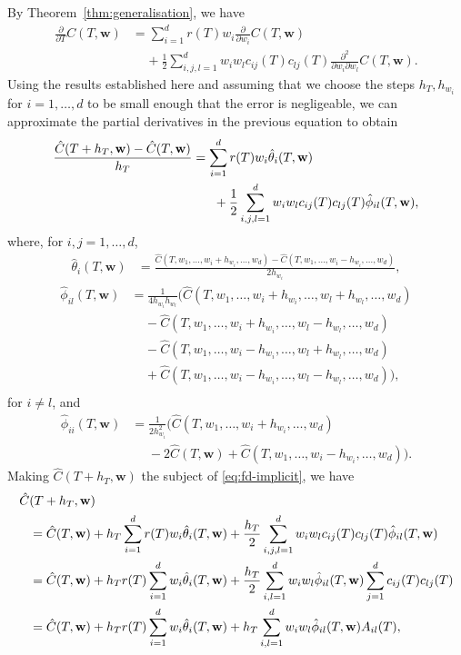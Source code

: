 \documentclass[english]{article}
\numberwithin{equation}{section}
\numberwithin{figure}{section}
\theoremstyle{bolddescit}
\theoremstyle{definition}
\theoremstyle{definition}
\theoremstyle{plain}
\theoremstyle{plain}
\theoremstyle{bolddesc}
\theoremstyle{plain}
\theoremstyle{remark}
\begin{document}
By Theorem~\ref{thm:generalisation}, we have
\begin{align*}
  \frac{\partial}{\partial T} C(T,\mathbf{w})
  &= \sum_{i=1}^{d} r(T) w_i \frac{\partial}{\partial w_i} C(T,\mathbf{w})\\
  &\ \ \ \ \ + \frac{1}{2} \sum_{i,j,l=1}^{d} w_i w_l c_{ij}(T) c_{lj}(T) \frac{\partial^2}{\partial w_i \partial w_l} C(T,\mathbf{w}).
\end{align*}
Using the results established here and assuming that we choose the steps $h_T, h_{w_i}$ for $i=1,\ldots,d$ to be small enough that the error is negligeable, we can approximate the partial derivatives in the previous equation to obtain
\begin{align}\label{eq:fd-implicit}
  \frac{\hat{C}(T+h_T,\mathbf{w}) - \hat{C}(T,\mathbf{w})}{h_T}
  &= \sum_{i=1}^{d} r(T) w_i \hat{\theta}_i(T,\mathbf{w})\notag\\
    &\ \ \ \ \ + \frac{1}{2} \sum_{i,j,l=1}^{d} w_i w_l c_{ij}(T) c_{lj}(T) \hat{\phi}_{il}(T,\mathbf{w}),
\end{align}
where, for $i,j=1,\ldots,d$,
\begin{align*}
  \hat{\theta}_i(T,\mathbf{w})
  &= \frac{\hat{C}(T,w_1,\ldots,w_i+h_{w_i},\ldots,w_d) - \hat{C}(T,w_1,\ldots,w_i-h_{w_i},\ldots,w_d)}{2h_{w_i}},
\end{align*}
\begin{align*}
  \hat{\phi}_{il}(T,\mathbf{w})
  &= \frac{1}{4 h_{w_i} h_{w_l}} \Bigg( \hat{C}(T,w_1,\ldots,w_i+h_{w_i},\ldots,w_l+h_{w_l},\ldots,w_d)\\
  &\ \ \ \ \ - \hat{C}(T,w_1,\ldots,w_i+h_{w_i},\ldots,w_l-h_{w_l},\ldots,w_d)\\
  &\ \ \ \ \ - \hat{C}(T,w_1,\ldots,w_i-h_{w_i},\ldots,w_l+h_{w_l},\ldots,w_d)\\
  &\ \ \ \ \ + \hat{C}(T,w_1,\ldots,w_i-h_{w_i},\ldots,w_l-h_{w_l},\ldots,w_d) \Bigg),\\
\end{align*}
for $i \neq l$, and
\begin{align*}
  \hat{\phi}_{ii}(T,\mathbf{w})
  &= \frac{1}{2 h_{w_i}^2} \Bigg( \hat{C}(T,w_1,\ldots,w_i+h_{w_i},\ldots,w_d)\\
  & \ \ \ \ \ \ - 2\hat{C}(T,\mathbf{w}) + \hat{C}(T,w_1,\ldots,w_i-h_{w_i},\ldots,w_d) \Bigg).
\end{align*}
Making $\hat{C}(T+h_T, \mathbf{w})$ the subject of \eqref{eq:fd-implicit}, we have
\begin{align}
  \hat{C}&(T+h_T,\mathbf{w})\notag\\
  &= \hat{C}(T,\mathbf{w}) + h_T \sum_{i=1}^{d} r(T) w_i \hat{\theta}_i(T,\mathbf{w})
     + \frac{h_T}{2} \sum_{i,j,l=1}^{d} w_i w_l c_{ij}(T) c_{lj}(T) \hat{\phi}_{il}(T,\mathbf{w})\notag\\
  &= \hat{C}(T,\mathbf{w}) + h_T r(T) \sum_{i=1}^{d} w_i \hat{\theta}_i(T,\mathbf{w}) + \frac{h_T}{2} \sum_{i,l=1}^{d} w_i w_l \hat{\phi}_{il}(T,\mathbf{w}) \sum_{j=1}^d c_{ij}(T) c_{lj}(T)\notag\\
  &= \hat{C}(T,\mathbf{w}) + h_T r(T) \sum_{i=1}^{d} w_i \hat{\theta}_i(T,\mathbf{w}) + h_T \sum_{i,l=1}^{d} w_i w_l \hat{\phi}_{il}(T,\mathbf{w}) A_{il}(T),\label{eq:fd-chat-recur}
\end{align}
\end{document}
